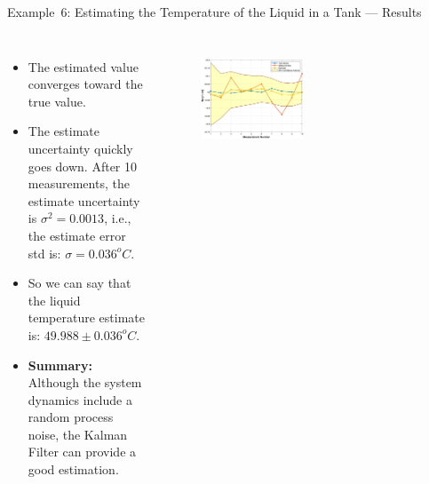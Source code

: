 \begin{frame}{Example~6: Estimating the Temperature of the Liquid in a Tank --- Results} 
\begin{columns}
    \begin{itemize}
        \item The estimated value converges toward the true value.
        \item The estimate uncertainty quickly goes down. After 10 measurements, the estimate uncertainty is $\sigma^2=0.0013$, i.e., the estimate error std is: $\sigma=0.036^oC$.
        \item So we can say that the liquid temperature estimate is: $49.988 \pm 0.036^oC$.
        \item \textbf{Summary:} Although the system dynamics include a random process noise, the Kalman Filter can provide a good estimation.
    \end{itemize}
    \vspace{-10pt}
    \begin{figure}
        \centering
        \includegraphics[width=0.8\textwidth]{Figures/Chapter1/ex6_KalmanFilter_ProcessNoise_95CI.eps}
\label{fig:ex6_KalmanFilter_ProcessNoise_95CI}
    \end{figure}
    \begin{figure}
        \centering

\end{figure}
\end{columns}
\end{frame}
